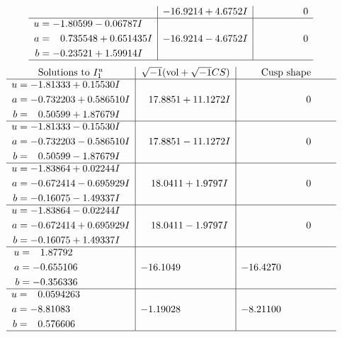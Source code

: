 \documentclass[1p]{elsarticle_modified}
\theoremstyle{definition}
\newcommand{\I}{\sqrt{-1}}
\begin{document}
$$\begin{array}{c|c|c}
 & -16.9214 + 4.6752 I & \phantom{-0.000000 } 0 \\ \hline\begin{aligned}
u &= -1.80599 - 0.06787 I \\
a &= \phantom{-}0.735548 + 0.651435 I \\
b &= -0.23521 + 1.59914 I\end{aligned}
 & -16.9214 - 4.6752 I & \phantom{-0.000000 } 0\\
 \hline 
 \end{array}$$\newpage$$\begin{array}{c|c|c}  
\text{Solutions to }I^u_{1}& \I (\text{vol} + \sqrt{-1}CS) & \text{Cusp shape}\\
 \hline 
\begin{aligned}
u &= -1.81333 + 0.15530 I \\
a &= -0.732203 + 0.586510 I \\
b &= \phantom{-}0.50599 + 1.87679 I\end{aligned}
 & \phantom{-}17.8851 + 11.1272 I & \phantom{-0.000000 } 0 \\ \hline\begin{aligned}
u &= -1.81333 - 0.15530 I \\
a &= -0.732203 - 0.586510 I \\
b &= \phantom{-}0.50599 - 1.87679 I\end{aligned}
 & \phantom{-}17.8851 - 11.1272 I & \phantom{-0.000000 } 0 \\ \hline\begin{aligned}
u &= -1.83864 + 0.02244 I \\
a &= -0.672414 - 0.695929 I \\
b &= -0.16075 - 1.49337 I\end{aligned}
 & \phantom{-}18.0411 + 1.9797 I & \phantom{-0.000000 } 0 \\ \hline\begin{aligned}
u &= -1.83864 - 0.02244 I \\
a &= -0.672414 + 0.695929 I \\
b &= -0.16075 + 1.49337 I\end{aligned}
 & \phantom{-}18.0411 - 1.9797 I & \phantom{-0.000000 } 0 \\ \hline\begin{aligned}
u &= \phantom{-}1.87792\phantom{ +0.000000I} \\
a &= -0.655106\phantom{ +0.000000I} \\
b &= -0.356336\phantom{ +0.000000I}\end{aligned}
 & -16.1049\phantom{ +0.000000I} & -16.4270\phantom{ +0.000000I} \\ \hline\begin{aligned}
u &= \phantom{-}0.0594263\phantom{ +0.000000I} \\
a &= -8.81083\phantom{ +0.000000I} \\
b &= \phantom{-}0.576606\phantom{ +0.000000I}\end{aligned}
 & -1.19028\phantom{ +0.000000I} & -8.21100\phantom{ +0.000000I}\\
 \hline 
 \end{array}$$\newpage\newpage\renewcommand{\arraystretch}{1}
\end{document}
